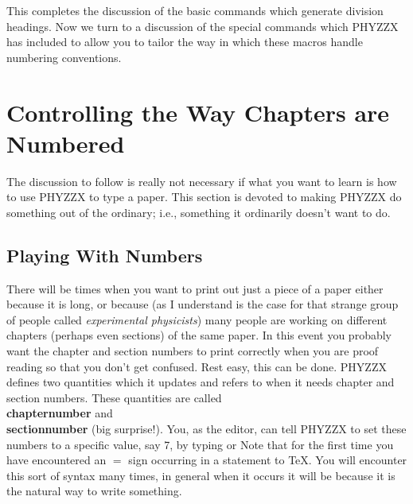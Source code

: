 This completes the discussion of the basic commands which generate
division headings.
Now we turn to a discussion of the special commands which
PHYZZX has included to allow you to tailor the way in which
these macros handle numbering conventions.
 
\section{Controlling the Way Chapters are Numbered}
 
The discussion to follow is really not necessary if what you want to
learn is how to use PHYZZX to type a paper.
This section is devoted to making PHYZZX do something out of
the ordinary; i.e., something it ordinarily doesn't want to do.
 
\subsection{Playing With Numbers}
 
There will be times when you want to print out just a
piece of a paper either because it is long, or because (as I
understand is the case for that strange group of people called
{\it experimental physicists}) many people are working on different
chapters (perhaps even sections) of the same paper.
In this event you probably want the chapter and section numbers to
print correctly when you are proof reading so that you don't get
confused.
Rest easy, this can be done.
PHYZZX defines two quantities which it updates and refers to when
it needs chapter and section numbers.
These quantities are called {\bf \\chapternumber} and
{\bf \\sectionnumber} (big surprise!).
You, as the editor, can tell PHYZZX to set these numbers to a
specific value, say 7, by typing
or
Note that for the first time you have encountered an $=$
sign occurring in a statement to \TeX .
You will encounter this sort of syntax many times,
in general when it occurs it will be because it is the natural
way to write something.
 
